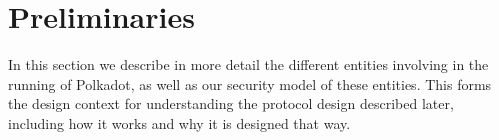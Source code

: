 \section{Preliminaries}\label{sec:preliminaries}


In this section we describe in more detail the different entities involving in the running of Polkadot, as well as our security model of these entities. This forms the design context for understanding the protocol design described later, including how it works and why it is designed that way.





